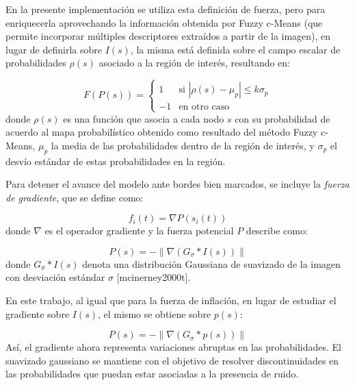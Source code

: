 En la presente implementación se utiliza esta definición de fuerza, pero para enriquecerla aprovechando la información obtenida por Fuzzy c-Means (que permite incorporar múltiples descriptores extraídos a partir de la imagen), en lugar de definirla sobre $I(s)$, la misma está definida sobre el campo escalar de probabilidades $\rho(s)$ asociado a la región de interés, resultando en:

%
\begin{equation}
F(P(s)) = \begin{cases} 1 & \text{si } \left|\rho(s) - \mu_{p} \right| \leq k\sigma_{p} \\ -1 & \text{en otro caso} \end{cases}
\end{equation}
%
donde $\rho(s)$ es una función que asocia a cada nodo $s$ con su probabilidad de acuerdo al mapa probabilístico obtenido como resultado del método Fuzzy c-Means, $\mu_{p}$ la media de las probabilidades dentro de la región de interés, y $\sigma_{p}$ el desvío estándar de estas probabilidades en la región.

Para detener el avance del modelo ante bordes bien marcados, se incluye la \emph{fuerza de gradiente}, que se define como:

%
\begin{equation}
f_{i}(t) = \nabla P(s_{i}(t))
\end{equation}
%
donde $\nabla$ es el operador gradiente y la fuerza potencial $P$ describe como:

%
\begin{equation}
P(s) = - \left\| \nabla(G_{\sigma} * I(s)) \right\| 
\label{eq:zz}
\end{equation}
%
donde $G_{\sigma} * I(s)$ denota una distribución Gaussiana de suavizado de la imagen con desviación estándar $\sigma$ [mcinerney2000t].

En este trabajo, al igual que para la fuerza de inflación, en lugar de estudiar el gradiente sobre $I(s)$, el mismo se obtiene sobre $p(s)$:

%
\begin{equation}
P(s) = - \left\| \nabla(G_{\sigma} * p(s)) \right\|
\end{equation}
%
Así, el gradiente ahora representa variaciones abruptas en las probabilidades. El suavizado gaussiano se mantiene con el objetivo de resolver discontinuidades en las probabilidades que puedan estar asociadas a la presencia de ruido.

